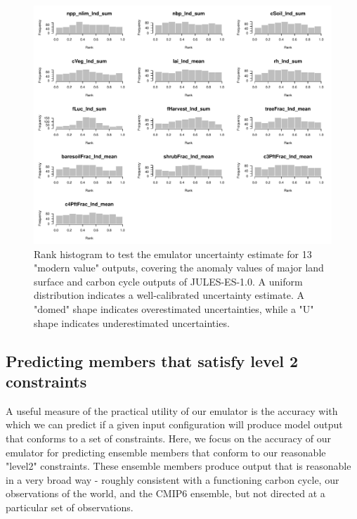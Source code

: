 \documentclass[gmd, manuscript]{copernicus}
\begin{document}
\begin{figure}[ht]
\includegraphics[width=12cm]{./figs/figA05.pdf}
\caption{Rank histogram to test the emulator uncertainty estimate for 13 "modern value" outputs, covering the anomaly values of major land surface and carbon cycle outputs of JULES-ES-1.0. A uniform distribution indicates a well-calibrated uncertainty estimate. A "domed" shape indicates overestimated uncertainties, while a "U" shape indicates underestimated uncertainties.}
\label{fig:anomaly_rank_histogram_comparison}
\end{figure}



\subsection{Predicting members that satisfy level 2 constraints}\label{app:level_2_pred} 

A useful measure of the practical utility of our emulator is the accuracy with which we can predict if a given input configuration will produce model output that conforms to a set of constraints. Here, we focus on the accuracy of our emulator for predicting ensemble members that conform to our reasonable "level2" constraints. These ensemble members produce output that is reasonable in a very broad way - roughly consistent with a functioning carbon cycle, our observations of the world, and the CMIP6 ensemble, but not directed at a particular set of observations.
\end{document}
